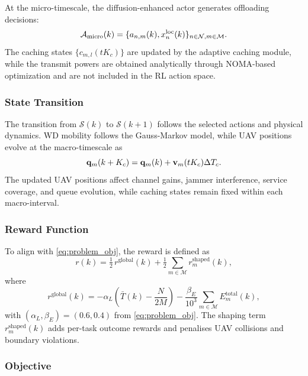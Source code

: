\documentclass[journal]{IEEEtran}
\begin{document}
At the micro-timescale, the diffusion-enhanced actor generates offloading decisions:
\begin{equation}
\small
\mathcal{A}_{\mathrm{micro}}(k)
=
\{a_{n,m}(k),x_n^{\mathrm{loc}}(k)\}_{n\in\mathcal{N},m\in\mathcal{M}}.
\end{equation}
The caching states $\{c_{m,l}(tK_c)\}$ are updated by the adaptive caching module, while the transmit powers are obtained analytically through NOMA-based optimization and are not included in the RL action space.

\subsubsection{State Transition}

The transition from $\mathcal{S}(k)$ to $\mathcal{S}(k+1)$ follows the selected actions and physical dynamics. WD mobility follows the Gauss-Markov model, while UAV positions evolve at the macro-timescale as
\begin{equation}
\small
\mathbf{q}_m(k+K_c)=\mathbf{q}_m(k)+\mathbf{v}_m(tK_c)\Delta T_c .
\end{equation}
The updated UAV positions affect channel gains, jammer interference, service coverage, and queue evolution, while caching states remain fixed within each macro-interval.

\subsubsection{Reward Function}
To align with \eqref{eq:problem_obj}, the reward is defined as
\begin{equation}
    r(k) = \tfrac{1}{2}\,r^{\mathrm{global}}(k)
           + \tfrac{1}{2}\sum_{m\in\mathcal{M}} r_m^{\mathrm{shaped}}(k),
    \label{eq:reward}
\end{equation}
where
\begin{equation}
    r^{\mathrm{global}}(k)
    = -\alpha_L\!\left(\bar{T}(k) - \frac{N}{2M}\right)
      - \frac{\beta_E}{10^3}
        \sum_{m\in\mathcal{M}} E_m^{\mathrm{total}}(k),
    \label{eq:reward_global}
\end{equation}
with $(\alpha_L,\beta_E){=}(0.6,0.4)$ from \eqref{eq:problem_obj}.
The shaping term $r_m^{\mathrm{shaped}}(k)$ adds per-task outcome
rewards and penalises UAV collisions and boundary violations.

\subsubsection{Objective}
\end{document}
